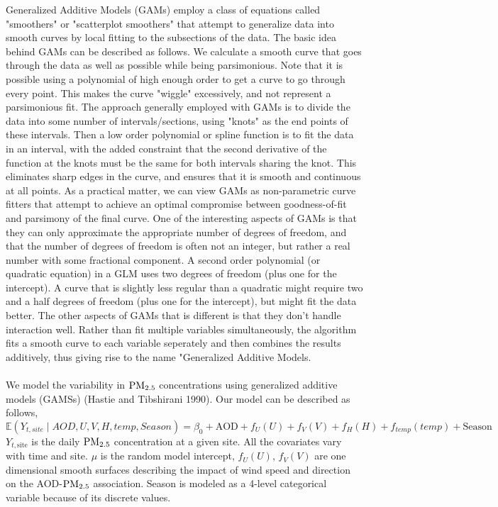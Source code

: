 \documentclass[10pt]{article}
\begin{document}
\begin{itemize}
Generalized Additive Models (GAMs) employ a class of equations called "smoothers" or "scatterplot smoothers" that attempt to generalize data into smooth curves by local fitting to the subsections of the data. The basic idea behind GAMs can be described as follows. We calculate a smooth curve that goes through the data as well as possible while being parsimonious. Note that it is possible using a polynomial of high enough order to get a curve to go through every point. This makes the curve "wiggle" excessively, and not represent a parsimonious fit. The approach generally employed with GAMs is to divide the data into some number of intervals/sections, using "knots" as the end points of these intervals. Then a low order polynomial or spline function is to fit the data in an interval, with the added constraint that the second derivative of the function at the knots must be the same for both intervals sharing the knot. This eliminates sharp edges in the curve, and ensures that it is smooth and continuous at all points. As a practical matter, we can view GAMs as non-parametric curve fitters that attempt to achieve an optimal compromise between goodness-of-fit and parsimony of the final curve. One of the interesting aspects of GAMs is that they can only approximate the appropriate number of degrees of freedom, and that the number of degrees of freedom is often not an integer, but rather a real number with some fractional component. A second order polynomial (or quadratic equation) in a GLM uses two degrees of freedom (plus one for the intercept). A curve that is slightly less regular than a quadratic might require two and a half degrees of freedom (plus one for the intercept), but might fit the data better. The other aspects of GAMs that is different is that they don't handle interaction well. Rather than fit multiple variables simultaneously, the algorithm fits a smooth curve to each variable seperately and then combines the results additively, thus giving rise to the name "Generalized Additive Models. \\ \\
We model the variability in ${\mathrm{PM_{2.5}}}$ concentrations using generalized additive models (GAMSs) (Hastie and Tibshirani 1990). Our model can be described as follows, 
\begin{equation} 
{\mathbb{E}}(Y_{t,site} \mid AOD, U, V, H, temp, Season) = \beta_0 + \text{AOD} + f_{U}(U) + f_{V}(V) + f_{H}(H) + f_{temp}(temp) + \text{Season}  
\end{equation} 
$Y_{t, \text{site}}$ is the daily ${\mathrm{PM_{2.5}}}$ concentration at a given site. All the covariates vary with time and site. $\mu$ is the random model intercept, $f_{U}(U)$, $f_{V}(V)$ are one dimensional smooth surfaces describing the impact of wind speed and direction on the AOD-${\mathrm{PM_{2.5}}}$ association. Season is modeled as a 4-level categorical variable because of its discrete values. \\ \\

\end{itemize}
\end{document}
